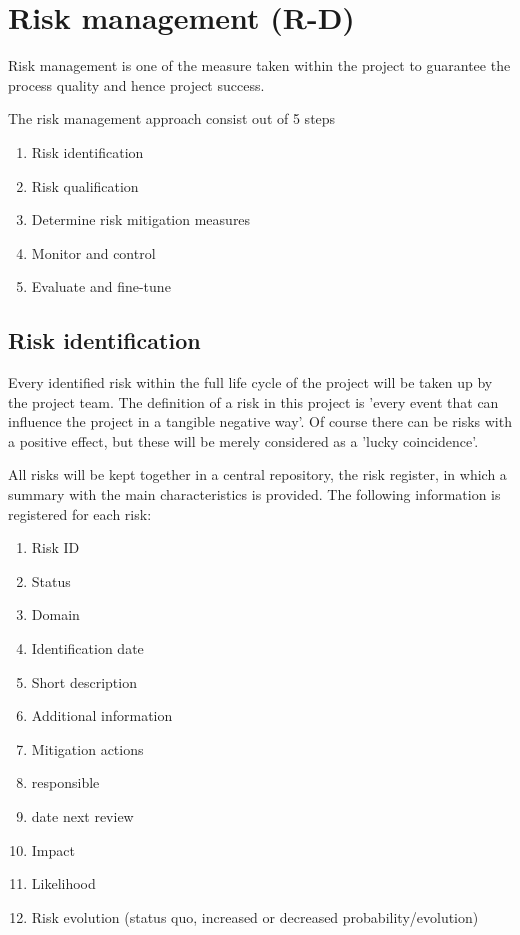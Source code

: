 \section{Risk management (R-D)}
\label{sec:risk-management}
Risk management is one of the measure taken within the project to guarantee the process quality and hence project success.

The risk management approach consist out of 5 steps

\begin{enumerate}
	\item Risk identification 
	\item Risk qualification
	\item Determine risk mitigation measures
	\item Monitor and control
	\item Evaluate and fine-tune
\end {enumerate}
\subsection{Risk identification }
Every identified risk within the full life cycle of the project will be taken up by the project team. The definition of a risk in this project is  'every event that can influence the project in a tangible negative way'. Of course there can be risks with a positive effect, but these will be merely considered as a 'lucky coincidence'.

All risks will be kept together in a central repository, the risk register, in which a summary with the main characteristics is provided.
The following information is registered for each risk:

\begin{enumerate}
	\item Risk ID
	\item Status
	\item Domain
	\item Identification date
	\item Short description
	\item Additional information
	\item Mitigation actions
	\item responsible
	\item date next review
	\item Impact
	\item Likelihood
	\item Risk evolution (status quo, increased or decreased probability/evolution)
\end {enumerate}

